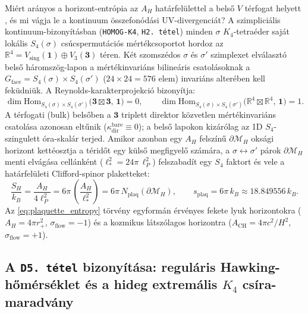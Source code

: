 \documentclass[11pt,a4paper]{article}
\theoremstyle{remark}
\begin{document}
Mi\'ert ar\'anyos a horizont-entr\'opia az $A_H$ hat\'arfel\"ulettel a bels\H{o} $V$ t\'erfogat helyett \cite{Bekenstein1973,Hawking1975}, \'es mi v\'agja le a kontinuum \"osszefon\'od\'asi UV-divergenci\'at? A szimplici\'alis kontinuum-bizony\'it\'asban (\texttt{HOMOG-K4}, \texttt{H2.\ t\'etel}) \cite{JolcsakTauFoundationSeries2026} minden $\sigma$ $K_4$-tetra\'eder saj\'at lok\'alis $S_4(\sigma)$ cs\'ucspermut\'aci\'os m\'ert\'ekcsoportot hordoz az $\mathbb{R}^4 = V_{\mathrm{sing}}(\mathbf{1}) \oplus V_3(\mathbf{3})$ t\'eren. K\'et szomsz\'edos $\sigma$ \'es $\sigma'$ szimplexet elv\'alaszt\'o bels\H{o} h\'aromsz\"og-lapon a m\'ert\'ekinvari\'ans biline\'aris csatol\'asoknak a $G_{\mathrm{face}} = S_4(\sigma) \times S_4(\sigma')$ ($24 \times 24 = 576$ elem) invari\'ans alter\'eben kell fek\"udni\"uk. A Reynolds-karakterprojekci\'o bizony\'itja:
\begin{equation}
  \dim \mathrm{Hom}_{S_4(\sigma)\times S_4(\sigma')}\bigl(\mathbf{3} \boxtimes \mathbf{3},\, \mathbf{1}\bigr) = 0, \qquad
  \dim \mathrm{Hom}_{S_4(\sigma)\times S_4(\sigma')}\bigl(\mathbb{R}^4 \boxtimes \mathbb{R}^4,\, \mathbf{1}\bigr) = 1.
  \label{eq:s4_reynolds_lock}
\end{equation}
A t\'erfogati (bulk) bels\H{o}ben a $\mathbf{3}$ triplett direktor k\"ozvetlen m\'ert\'ekinvari\'ans csatol\'asa azonosan elt\H{u}nik ($\kappa_{\mathrm{dir}}^{\mathrm{bare}} \equiv 0$); a bels\H{o} lapokon kiz\'ar\'olag az 1D $S_4$-szingulett \'ora-skal\'ar terjed. Amikor azonban egy $A_H$ felsz\'in\H{u} $\partial\mathcal{M}_H$ oks\'agi horizont kett\'eosztja a t\'erid\H{o}t egy k\"uls\H{o} megfigyel\H{o} sz\'am\'ara, a $\sigma \leftrightarrow \sigma'$ p\'arok $\partial\mathcal{M}_H$ menti elv\'ag\'asa cell\'ank\'ent ($\ell_*^2 = 24\pi\,\ell_P^2$) felszabad\'it egy $S_4$ faktort \'es vele a hat\'arfel\"uleti Clifford-spinor plaketteket:
\begin{equation}
  \frac{S_H}{k_B} = \frac{A_H}{4\ell_P^2} = 6\pi\,\left(\frac{A_H}{\ell_*^2}\right) = 6\pi\,N_{\mathrm{plaq}}\!\left(\partial\mathcal{M}_H\right), \qquad s_{\mathrm{plaq}} = 6\pi\,k_B \approx 18.849556\,k_B.
  \label{eq:plaquette_entropy}
\end{equation}
Az \eqref{eq:plaquette_entropy} t\"orv\'eny egyform\'an \'erv\'enyes fekete lyuk horizontokra ($A_H = 4\pi r_+^2$, $\sigma_{\mathrm{flow}} = -1$) \'es a kozmikus l\'atsz\'olagos horizontra ($A_{\mathrm{CH}} = 4\pi c^2/H^2$, $\sigma_{\mathrm{flow}} = +1$).

\subsection{A \texttt{D5.\ t\'etel} bizony\'it\'asa: regul\'aris Hawking-h\H{o}m\'ers\'eklet \'es a hideg extrem\'alis \texorpdfstring{$K_4$}{K4} cs\'ira-maradv\'any}
\end{document}
